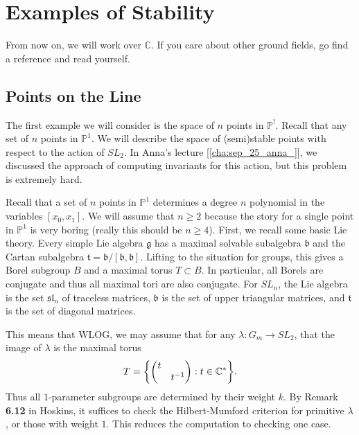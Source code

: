 \documentclass[leqno, openany]{memoir}
\theoremstyle{definition}
\theoremstyle{remark}
\theoremstyle{plain}
\theoremstyle{definition}
\theoremstyle{remark}
\newcommand{\C}{\mathbb{C}}
\renewcommand{\P}{\mathbb{P}}
\newcommand{\mf}[1]{\mathfrak{#1}}
\begin{document}
\section{Examples of Stability}%

From now on, we will work over $\C$. If you care about other ground fields, go
find a reference and read yourself.

\subsection{Points on the Line}%

The first example we will consider is the space of $n$ points in $\P^!$. Recall
that any set of $n$ points in $\P^1$. We will describe the space of
(semi)stable points with respect to the action of $SL_2$. In Anna's lecture
[\autoref{cha:sep_25_anna_}], we discussed the approach of computing invariants
for this action, but this problem is extremely hard.

Recall that a set of $n$ points in $\P^1$ determines a degree $n$ polynomial in
the variables $[x_0,x_1]$. We will assume that $n \geq 2$ because the story for
a single point in $\P^1$ is very boring (really this should be $n \geq 4$).
First, we recall some basic Lie theory. Every simple Lie algebra $\mf{g}$ has a
maximal solvable subalgebra $\mf{b}$ and the Cartan subalgebra $\mf{t} = \mf{b}
/ [\mf{b},\mf{b}]$. Lifting to the situation for groups, this gives a Borel
subgroup $B$ and a maximal torus $T \subset B$. In particular, all Borels are
conjugate and thus all maximal tori are also conjugate. For $SL_n$, the Lie
algebra is the set $\mf{sl}_n$ of traceless matrices, $\mf{b}$ is the set of
upper triangular matrices, and $\mf{t}$ is the set of diagonal matrices.

This means that WLOG, we may assume that for any $\lambda \colon G_m \to SL_2$,
that the image of $\lambda$ is the maximal torus \[ T = \qty{
\mqty(\dmat{t,t^{-1}}) : t \in \C^* }. \] Thus all $1$-parameter subgroups are
determined by their weight $k$. By Remark \textbf{6.12} in Hoskins, it suffices
to check the Hilbert-Mumford criterion for primitive $\lambda$, or those with
weight $1$. This reduces the computation to checking one case.
\end{document}
